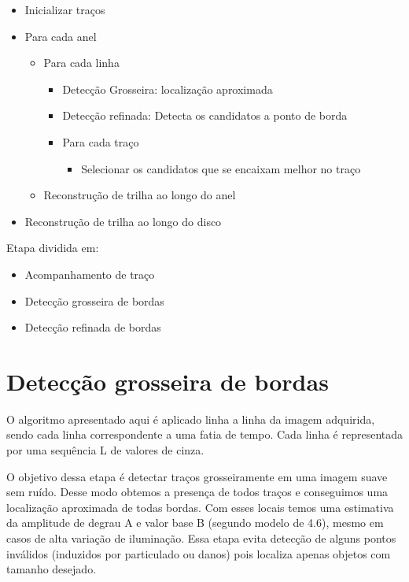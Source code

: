 \documentclass[
	12pt,				%
	openright,			%
	twoside,			%
	a4paper,			%
	english,			%
	french,				%
	spanish,			%
	brazil				%
	]{abntex2}
\begin{document}
\begin{itemize}

\item Inicializar traços
\item Para cada anel
	\begin{itemize}
    \item Para cada linha
    \begin{itemize}
        \item Detecção Grosseira: localização aproximada
        \item Detecção refinada: Detecta os candidatos a ponto de borda
        \item Para cada traço
        \begin{itemize}
        	\item Selecionar os candidatos que se encaixam melhor no traço
		\end{itemize}
	\end{itemize}
    \item Reconstrução de trilha ao longo do anel
	\end{itemize}
\item Reconstrução de trilha ao longo do disco
\end{itemize}

Etapa dividida em:
\begin{itemize}
\item Acompanhamento de traço
\item Detecção grosseira de bordas
\item Detecção refinada de bordas
\end{itemize}

\section{Detecção grosseira de bordas} \label{sec:detec_grosseira}
O algoritmo apresentado aqui é aplicado linha a linha da imagem adquirida, sendo cada linha correspondente a uma fatia de tempo. Cada linha é representada por uma sequência L de valores de cinza.

O objetivo dessa etapa é detectar traços grosseiramente em uma imagem suave sem ruído.
Desse modo obtemos a presença de todos traços e conseguimos uma localização aproximada de todas bordas. Com esses locais temos uma estimativa da amplitude de degrau A e valor base B (segundo modelo de {4.6}), mesmo em casos de alta variação de iluminação.
Essa etapa evita detecção de alguns pontos inválidos (induzidos por particulado ou danos) pois localiza apenas objetos com tamanho desejado.
\end{document}
